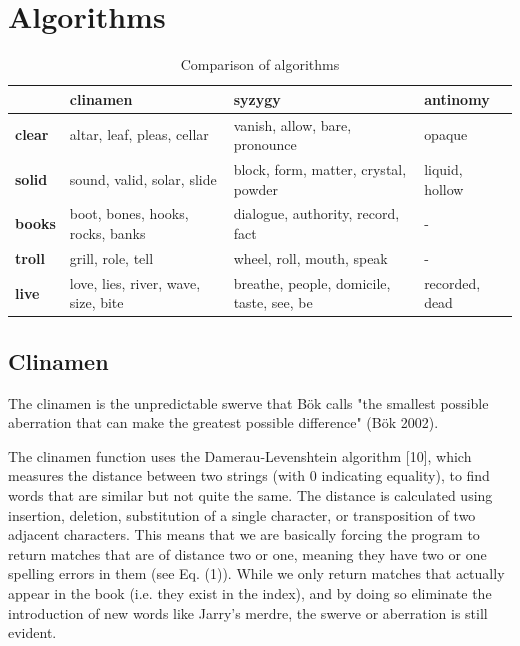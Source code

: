 \section{Algorithms}

\begin{table}[htb]
  \begin{tabu}{X[1]|X[3]X[3]X[2]}
  \toprule
  &
  \textbf{clinamen}
  &
  \textbf{syzygy}
  &
  \textbf{antinomy}
  \\ \midrule
  \textbf{clear}
  &
  altar, leaf, pleas, cellar
  &
  vanish, allow, bare, pronounce
  &
  opaque
  \\ \midrule
  \textbf{solid}
  &
  sound, valid, solar, slide
  &
  block, form, matter, crystal, powder
  &
  liquid, hollow
  \\ \midrule
  \textbf{books}
  &
  boot, bones, hooks, rocks, banks
  &
  dialogue, authority, record, fact
  &
  -
  \\ \midrule
  \textbf{troll}
  &
  grill, role, tell
  &
  wheel, roll, mouth, speak
  &
  -
  \\ \midrule
  \textbf{live}
  &
  love, lies, river, wave, size, bite
  &
  breathe, people, domicile, taste, see, be
  &
  recorded, dead
  \\ \bottomrule
  \end{tabu}
\caption[Comparison of algorithms]{Comparison of algorithms}
\label{algorithmscomp}
\end{table}

\subsection{Clinamen}

The clinamen is the unpredictable swerve that Bök calls "the smallest possible aberration that can make the greatest possible difference" (Bök 2002).

The clinamen function uses the Damerau-Levenshtein algorithm [10], which measures the distance between two strings (with 0 indicating equality), to find words that are similar but not quite the same. The distance is calculated using insertion, deletion, substitution of a single character, or transposition of two adjacent characters. This means that we are basically forcing the program to return matches that are of distance two or one, meaning they have two or one spelling errors in them (see Eq. (1)). While we only return matches that actually appear in the book (i.e. they exist in the index), and by doing so eliminate the introduction of new words like Jarry's merdre, the swerve or aberration is still evident.

